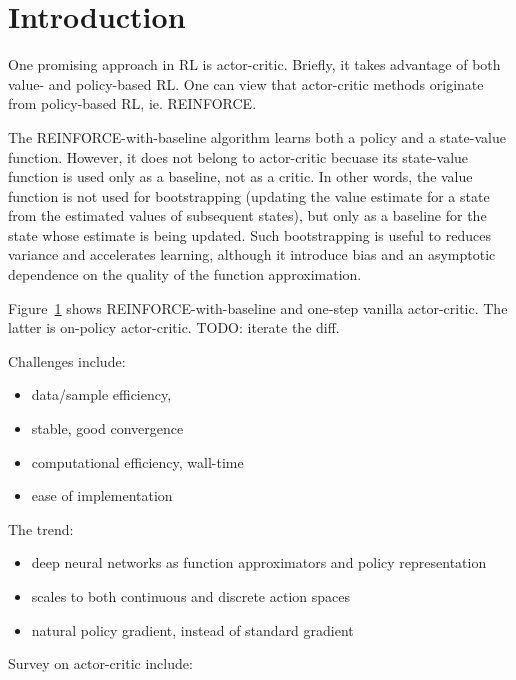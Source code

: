 \section{Introduction}

One promising approach in RL is actor-critic.
Briefly, it takes advantage of both value- and policy-based RL.
One can view that actor-critic methods originate from policy-based RL, ie. REINFORCE.

The REINFORCE-with-baseline algorithm learns both a policy and a state-value function.
However, it does not belong to actor-critic becuase
its state-value function is used only as a baseline, not as a critic.
In other words, the value function is not used for bootstrapping
(updating the value estimate for a state from the estimated values of subsequent states),
but only as a baseline for the state whose estimate is being updated.
Such bootstrapping is useful to reduces variance and accelerates learning,
although it introduce bias and an asymptotic dependence on
the quality of the function approximation.

Figure~\ref{} shows REINFORCE-with-baseline and one-step vanilla actor-critic.
The latter is on-policy actor-critic.
TODO: iterate the diff.

Challenges include:
\begin{itemize}
\item data/sample efficiency,
\item stable, good convergence
\item computational efficiency, wall-time
\item ease of implementation
\end{itemize}

The trend:
\begin{itemize}
\item deep neural networks as
      function approximators and policy representation
\item scales to both continuous and discrete action spaces
\item natural policy gradient, instead of standard gradient
\end{itemize}

Survey on actor-critic include:
\cite{6392457}
